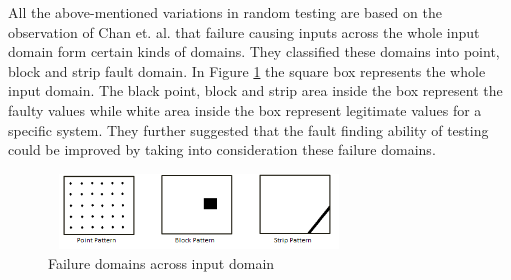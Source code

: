 All the above-mentioned variations in random testing are based on the observation of Chan et. al. \cite{Chan1996} that failure causing inputs across the whole input domain form certain kinds of domains. They classified these domains into point, block and strip fault domain. In Figure \ref{fig:patterns} the square box represents the whole input domain. The black point, block and strip area inside the box represent the faulty values while white area inside the box represent legitimate values for a specific system. They further suggested that the fault finding ability of testing could be improved by taking into consideration these failure domains.

\begin{figure}[h]
\centering
\includegraphics[width=8cm,height=2cm]{chapter5/ART_Patterns.png}
\caption{Failure domains across input domain \cite{Chan1996}}
\label{fig:patterns}
\end{figure}






